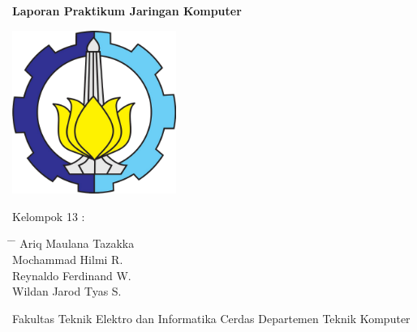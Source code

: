 \begin{titlepage}
    \begin{center}
        \Huge
        \textbf{Laporan Praktikum Jaringan Komputer}
        
        
        \vspace{5cm}
        
        \includegraphics[width=0.4\textwidth]{image/its-logo.png}
        
        \vspace{3cm}

        Kelompok 13 :

    \end{center}
        
    \Large
    \begin{tabbing}
        \hspace*{1em}\= \hspace*{20em} \= \kill %
        \> Ariq Maulana Tazakka \\
        \> Mochammad Hilmi R. \\
        \> Reynaldo Ferdinand W. \\
        \> Wildan Jarod Tyas S. \\
    \end{tabbing}

    \begin{center}
        Fakultas Teknik Elektro dan Informatika Cerdas
        Departemen Teknik Komputer
    \end{center}
\end{titlepage}

